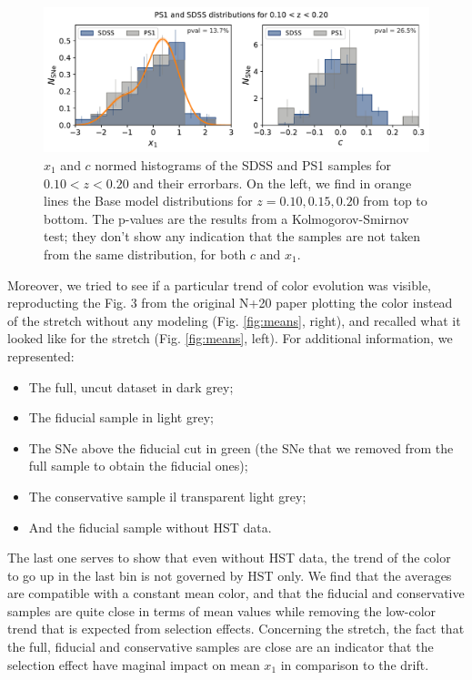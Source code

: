 \documentclass[11pt,a4paper]{paper}
\begin{document}
\vspace{30pt}

\begin{figure}[htbp!]
    \centering
    \includegraphics[width=.9\linewidth]{Answer_figures/both-cut_SDSS_PS1-010-020.pdf}
    \captionsetup{justification=centering, font=small}
    \caption{$x_1$ and $c$ normed histograms of the SDSS and PS1 samples for
        $0.10 < z < 0.20$ and their errorbars. On the left, we find in orange
        lines the Base model distributions for $z = 0.10, 0.15, 0.20$ from top
        to bottom. The p-values are the results from a Kolmogorov-Smirnov test;
    they don't show any indication that the samples are not taken from the same
distribution, for both $c$ and $x_1$.}
\label{fig:distrib}
\end{figure}

Moreover, we tried to see if a particular trend of color evolution was visible,
reproducting the Fig. 3 from the original N+20 paper plotting the color instead
of the stretch without any modeling (Fig. \ref{fig:means}, right), and recalled what
it looked like for the stretch (Fig. \ref{fig:means}, left). For additional
information, we represented:
\begin{itemize}
    \item The full, uncut dataset in dark grey;
    \item The fiducial sample in light grey;
    \item The SNe above the fiducial cut in green (the SNe that we removed from
        the full sample to obtain the fiducial ones);
    \item The conservative sample il transparent light grey;
    \item And the fiducial sample without HST data.
\end{itemize}
The last one serves to show that even without HST data, the trend of the color
to go up in the last bin is not governed by HST only. We find that the averages
are compatible with a constant mean color, and that the fiducial and
conservative samples are quite close in terms of mean values while removing the
low-color trend that is expected from selection effects. Concerning the stretch,
the fact that the full, fiducial and conservative samples are close are an
indicator that the selection effect have maginal impact on mean $x_1$ in
comparison to the drift.
\end{document}
